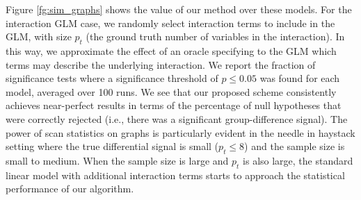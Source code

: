Figure \ref{fg:sim_graphs} shows the value of our method over these models. For the interaction GLM case, we randomly select interaction terms to include in the GLM, with size $p_t$ (the ground truth number of variables in the interaction). In this way, we approximate the effect of an oracle specifying to the GLM which terms may describe the underlying interaction. 
We report the fraction of significance tests where a significance threshold 
of $p \leq 0.05$ was found for each model, averaged over 100 runs. 
We see that our proposed scheme consistently achieves near-perfect results in terms of the percentage of null hypotheses that 
were correctly rejected (i.e., there was a significant group-difference signal). The power of scan statistics on 
graphs is particularly evident in the needle in haystack setting where the true differential signal is small ($p_t \leq 8$)
and the sample size is small to medium. When the sample size is large and $p_t$ is also large, the standard linear model with additional interaction terms starts to approach the statistical performance of our algorithm.

